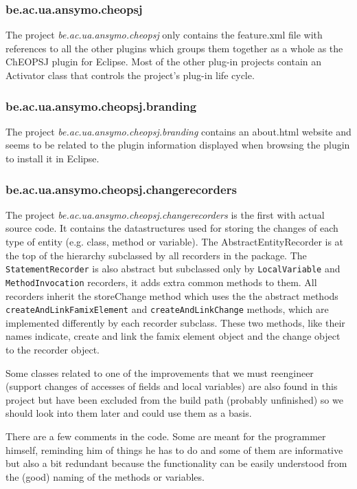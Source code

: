 \documentclass{article}
\begin{document}
\subsubsection{be.ac.ua.ansymo.cheopsj}
The project \emph{be.ac.ua.ansymo.cheopsj} only contains the feature.xml file with references to all the other plugins which groups them together as a whole as the ChEOPSJ plugin for Eclipse. Most of the other plug-in projects contain an Activator class that controls the project's plug-in life cycle.

\subsubsection{be.ac.ua.ansymo.cheopsj.branding}
The project \emph{be.ac.ua.ansymo.cheopsj.branding} contains an about.html website and seems to be related to the plugin information displayed when browsing the plugin to install it in Eclipse.

\subsubsection{be.ac.ua.ansymo.cheopsj.changerecorders}
The project \emph{be.ac.ua.ansymo.cheopsj.changerecorders} is the first with actual source code. It contains the datastructures used for storing the changes of each type of entity (e.g. class, method or variable).
The AbstractEntityRecorder is at the top of the hierarchy subclassed by all recorders in the package. The \verb+StatementRecorder+ is also abstract but subclassed only by \verb+LocalVariable+ and \verb+MethodInvocation+ recorders, it adds extra common methods to them. All recorders inherit the storeChange method which uses the the abstract methods \verb+createAndLinkFamixElement+ and \verb+createAndLinkChange+ methods, which are implemented differently by each recorder subclass. These two methods, like their names indicate, create and link the famix element object and the change object to the recorder object.

Some classes related to one of the improvements that we must reengineer (support changes of accesses of fields and local variables) are also found in this project but have been excluded from the build path (probably unfinished) so we should look into them later and could use them as a basis.

There are a few comments in the code. Some are meant for the programmer himself, reminding him of things he has to do and some of them are informative but also a bit redundant because the functionality can be easily understood from the (good) naming of the methods or variables.
\end{document}
